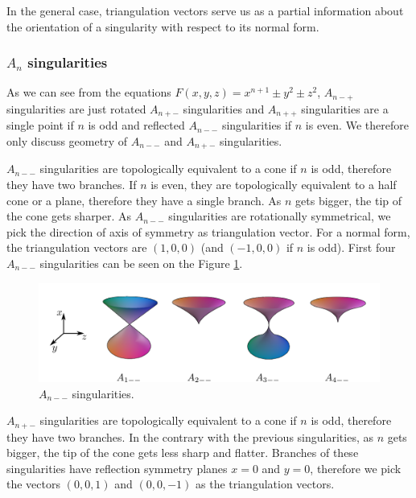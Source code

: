 In the general case, triangulation vectors serve us
as a partial information about the orientation of a singularity with 
respect to its normal form.

\subsubsection*{$A_n$ singularities}

As we can see from the equations 
$F(x,y,z)=x^{n+1}\pm y^2\pm z^2$, $A_{n-+}$
singularities are just rotated $A_{n+-}$ singularities and $A_{n++}$ singularities 
are a single point if $n$ is odd and reflected $A_{n--}$ singularities if $n$ is even. 
We therefore only discuss geometry of $A_{n--}$ and $A_{n+-}$ singularities.

$A_{n--}$ singularities are topologically equivalent to a cone if $n$ is odd, therefore
they have two branches.
If $n$ is even, they are topologically equivalent to a half cone or a plane, therefore
they have a single branch.
As $n$ gets bigger, the tip of the cone gets sharper. As $A_{n--}$ singularities
are rotationally symmetrical, we pick the direction of
axis of symmetry as triangulation vector. For a normal form, the triangulation vectors
are $(1, 0, 0)$ (and $(-1, 0, 0)$ if $n$ is odd).
First four $A_{n--}$ singularities can be seen on the Figure \ref{img:4}.

\begin{figure}
    \centerline{\includegraphics[scale=0.5]{images/img4}}
    \caption[$A_{n--}$ singularities]
    {$A_{n--}$ singularities. \cite{morris2003client}}
    \label{img:4}
\end{figure}


$A_{n+-}$ singularities are topologically equivalent to a cone if $n$ is odd, therefore
they have two branches.
In the contrary with the previous singularities, as $n$ gets bigger, the tip
of the cone gets less sharp and flatter. Branches of these singularities have 
reflection symmetry planes $x=0$ and $y=0$, therefore we pick the vectors
$(0, 0, 1)$ and $(0, 0, -1)$ as the triangulation vectors.

